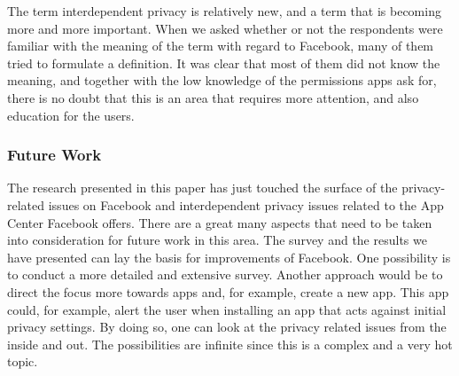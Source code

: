 The term interdependent privacy is relatively new, and a term that is becoming more and more important. When we asked whether or not the respondents were familiar with the meaning of the term with regard to Facebook, many of them tried to formulate a definition. It was clear that most of them did not know the meaning, and together with the low knowledge of the permissions apps ask for, there is no doubt that this is an area that requires more attention, and also education for the users. 

\subsubsection{Future Work}
The research presented in this paper has just touched the surface of the privacy-related issues on Facebook and interdependent privacy issues related to the App Center Facebook offers. There are a great many aspects that need to be taken into consideration for future work in this area. The survey and the results we have presented can lay the basis for improvements of Facebook. One possibility is to conduct a more detailed and extensive survey. Another approach would be to direct the focus more towards apps and, for example, create a new app. This app could, for example, alert the user when installing an app that acts against initial privacy settings. By doing so, one can look at the privacy related issues from the inside and out. The possibilities are infinite since this is a complex and a very hot topic.


